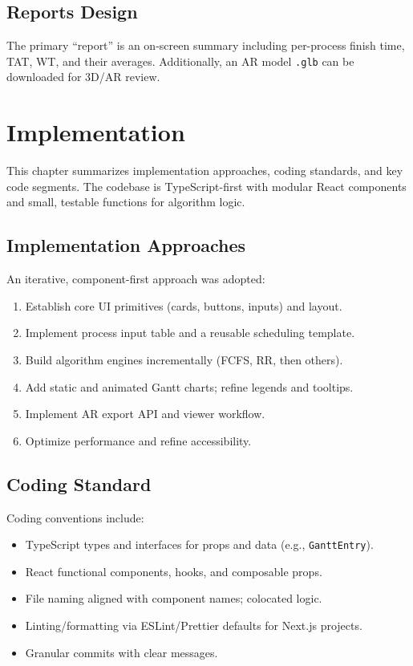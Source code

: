 \documentclass[12pt,a4paper,oneside]{report}
\begin{document}
\section{Reports Design}
The primary “report” is an on-screen summary including per-process finish time, TAT, WT, and their averages. Additionally, an AR model \texttt{.glb} can be downloaded for 3D/AR review.

\chapter{Implementation}
\noindent This chapter summarizes implementation approaches, coding standards, and key code segments. The codebase is TypeScript-first with modular React components and small, testable functions for algorithm logic.

\section{Implementation Approaches}
An iterative, component-first approach was adopted:
\begin{enumerate}
  \item Establish core UI primitives (cards, buttons, inputs) and layout.
  \item Implement process input table and a reusable scheduling template.
  \item Build algorithm engines incrementally (FCFS, RR, then others).
  \item Add static and animated Gantt charts; refine legends and tooltips.
  \item Implement AR export API and viewer workflow.
  \item Optimize performance and refine accessibility.
\end{enumerate}

\section{Coding Standard}
Coding conventions include:
\begin{itemize}
  \item TypeScript types and interfaces for props and data (e.g., \verb|GanttEntry|).
  \item React functional components, hooks, and composable props.
  \item File naming aligned with component names; colocated logic.
  \item Linting/formatting via ESLint/Prettier defaults for Next.js projects.
  \item Granular commits with clear messages.
\end{itemize}
\end{document}
